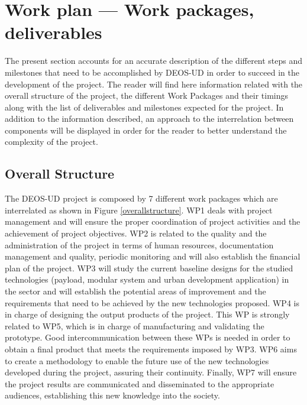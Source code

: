 \section{Work plan — Work packages, deliverables}

The present section accounts for an accurate description of the different steps and milestones that need to be accomplished by DEOS-UD in order to succeed in the development of the project. The reader will find here information related with the overall structure of the project, the different Work Packages and their timings along with the list of deliverables and milestones expected for the project. In addition to the information described, an approach to the interrelation between components will be displayed in order for the reader to better understand the complexity of the project.  

\subsection{Overall Structure}

The DEOS-UD project is composed by 7 different work packages which are interrelated as shown in Figure \ref{overallstructure}. WP1 deals with project management and will ensure the proper coordination of project activities and the achievement of project objectives. WP2 is related to the quality and the administration of the project in terms of human resources, documentation management and quality, periodic monitoring and will also establish the financial plan of the project. WP3 will study the current baseline designs for the studied technologies (payload, modular system and urban development application) in the sector and will establish the potential areas of improvement and the requirements that need to be achieved by the new technologies proposed. WP4 is in charge of designing the output products of the project. This WP is strongly related to WP5, which is in charge of manufacturing and validating the prototype. Good intercommunication between these WPs is needed in order to obtain a final product that meets the requirements imposed by WP3. WP6 aims to create a methodology to enable the future use of the new technologies developed during the project, assuring their continuity. Finally, WP7 will ensure the project results are communicated and disseminated to the appropriate audiences, establishing this new knowledge into the society. 

